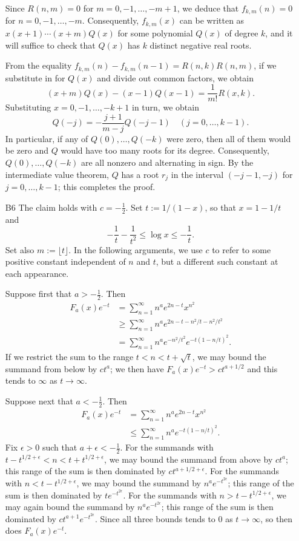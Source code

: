 \documentclass[amssymb,twocolumn,pra,10pt,aps]{revtex4-1}
\begin{document}
\begin{itemize}
Since $R(n,m) = 0$ for $m=0,-1,\dots,-m+1$, we deduce that $f_{k,m}(n) = 0$ for 
$n=0,-1,\dots,-m$. Consequently, $f_{k,m}(x)$ can be written as $x(x+1)\cdots(x+m) Q(x)$ for some polynomial $Q(x)$ of degree $k$, and it will suffice to check that $Q(x)$ has $k$ distinct negative real roots.

From the equality $f_{k,m}(n) - f_{k,m}(n-1) = R(n,k)R(n,m)$, if we substitute in for $Q(x)$
and divide out common factors, we obtain
\[
(x+m) Q(x) - (x-1) Q(x-1) = \frac{1}{m!} R(x,k).
\]
Substituting $x=0,-1,\dots,-k+1$ in turn, we obtain
\[
Q(-j) = - \frac{j+1}{m-j} Q(-j-1) \quad (j=0, \dots, k-1).
\]
In particular, if any of $Q(0),\dots,Q(-k)$ were zero, then all of them would be zero and 
$Q$ would have too many roots for its degree. Consequently, $Q(0),\dots,Q(-k)$ are all nonzero
and alternating in sign. By the intermediate value theorem, $Q$ has a root $r_j$ in the interval $(-j-1,-j)$ for $j=0,\dots,k-1$; this completes the proof.

\item[B6]
The claim holds with $c=-\frac{1}{2}$.
Set $t := 1/(1-x)$, so that $x = 1 - 1/t$
and
\[
- \frac{1}{t} - \frac{1}{t^2} \leq \log x \leq - \frac{1}{t}.
\]
Set also $m := \lfloor t \rfloor$.
In the following arguments, we use $c$ to refer to some positive constant independent of $n$ and $t$,
but a different such constant at each appearance.

Suppose first that $a > -\frac{1}{2}$. Then
\begin{align*}
F_a(x)e^{-t} &= \sum_{n=1}^\infty n^a e^{2n-t} x^{n^2}  \\
&\geq \sum_{n=1}^\infty n^a e^{2n-t-n^2/t-n^2/t^2}  \\
&= \sum_{n=1}^\infty n^a e^{-n^2/t^2} e^{-t(1-n/t)^2}.
\end{align*}
If we restrict the sum to the range $t < n < t + \sqrt{t}$, we may bound the summand from below by
$c t^a$; we then have
$F_a(x) e^{-t} > ct^{a+1/2}$ and this tends to $\infty$ as $t \to \infty$.

Suppose next that $a < -\frac{1}{2}$. Then
\begin{align*}
F_a(x)e^{-t} &= \sum_{n=1}^\infty n^a e^{2n-t} x^{n^2} \\
&\leq \sum_{n=1}^\infty n^a e^{-t(1-n/t)^2}.
\end{align*}
Fix $\epsilon>0$ such that $a+\epsilon < -\frac{1}{2}$.
For the summands with $t - t^{1/2+\epsilon} < n < t + t^{1/2+\epsilon}$, we may bound the summand from above by $ct^a$; this range of the sum is then dominated by
$ct^{a+1/2+\epsilon}$. 
For the summands with $n < t - t^{1/2+\epsilon}$, we may bound the summand by
$n^a e^{-t^{2\epsilon}}$; this range of the sum is then dominated by $t e^{-t^{2\epsilon}}$.
For the summands with $n > t - t^{1/2+\epsilon}$, we may again bound the summand by
$n^a e^{-t^{2\epsilon}}$; this range of the sum is then dominated by $c t^{a+1} e^{-t^{2\epsilon}}$.
Since all three bounds tends to 0 as $t \to \infty$, so then does $F_a(x) e^{-t}$.

\end{itemize}
\end{document}
